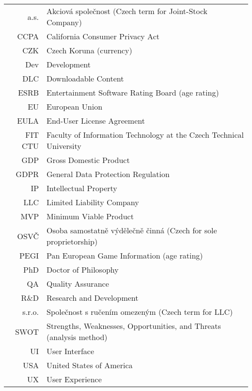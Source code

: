\documentclass[english,bachelor,oneside]{ctufit-thesis} %
\begin{document}
\chapter{\thectufitabbreviationlabel}
	
\begin{tabular}{rl}
a.s.    & Akciová společnost (Czech term for Joint-Stock Company)\\
CCPA    & California Consumer Privacy Act\\
CZK     & Czech Koruna (currency)\\
Dev     & Development\\
DLC     & Downloadable Content\\
ESRB    & Entertainment Software Rating Board (age rating)\\
EU      & European Union\\
EULA    & End-User License Agreement\\
FIT CTU & Faculty of Information Technology at the Czech Technical University\\
GDP     & Gross Domestic Product\\
GDPR    & General Data Protection Regulation\\
IP      & Intellectual Property\\
LLC     & Limited Liability Company\\
MVP     & Minimum Viable Product\\
OSVČ    & Osoba samostatně výdělečně činná (Czech for sole proprietorship)\\
PEGI    & Pan European Game Information (age rating)\\
PhD     & Doctor of Philosophy\\
QA      & Quality Assurance\\
R\&D    & Research and Development\\
s.r.o.  & Společnost s ručením omezeným (Czech term for LLC)\\
SWOT    & Strengths, Weaknesses, Opportunities, and Threats (analysis method)\\
UI      & User Interface\\
USA     & United States of America\\
UX      & User Experience\\
\end{tabular}
\resumeTOCentries
\mainmatter\mainmatterinit %
\end{document}
